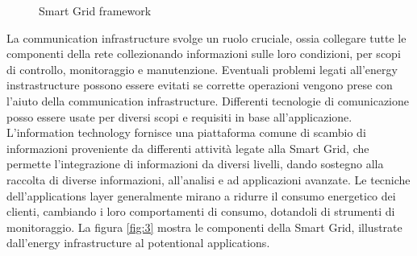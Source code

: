 \begin{figure}[h] 
\caption{Smart Grid framework}\label{fig:2}
\end{figure}

La communication infrastructure svolge un ruolo cruciale, ossia collegare tutte le componenti della rete collezionando informazioni sulle loro condizioni, per scopi di controllo, monitoraggio e manutenzione. Eventuali problemi legati all'energy instrastructure possono essere evitati se corrette operazioni vengono prese con l'aiuto della communication infrastructure. 
\newline 
Differenti tecnologie di comunicazione posso essere usate per diversi scopi e requisiti in base all'applicazione. L'information technology fornisce una piattaforma comune di scambio di informazioni proveniente da differenti attività legate alla Smart Grid, che permette l'integrazione di informazioni da diversi livelli, dando sostegno alla raccolta di diverse informazioni, all'analisi e ad applicazioni avanzate.
\newline
Le tecniche dell'applications layer generalmente mirano a ridurre il consumo energetico dei clienti, cambiando i loro comportamenti di consumo, dotandoli di strumenti di monitoraggio.    
\newline
La figura \ref{fig:3} mostra le componenti della Smart Grid, illustrate dall'energy infrastructure al potentional applications.

